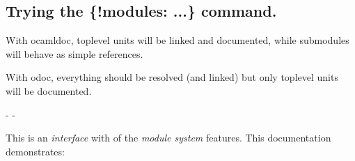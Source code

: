\\
    \hyperref[Ocamlary-IncludeInclude1]{}\label{Ocamlary-module-type-IncludeInclude2}\begin{ocamlindent}\label{Ocamlary-module-type-IncludeInclude2-type-include_include}\\
\end{ocamlindent}%
\\
\label{Ocamlary-module-IncludeInclude2_M}\begin{ocamlindent}\end{ocamlindent}%
\\
 \hyperref[Ocamlary-module-type-IncludeInclude2]{}\label{Ocamlary-type-include_include}\\
\subsection{Trying the \{!modules: ...\} command.\label{indexmodules}}%
With ocamldoc, toplevel units will be linked and documented, while submodules will behave as simple references.

With odoc, everything should be resolved (and linked) but only toplevel units will be documented.

\begin{description}\kern-\topsep
\makeatletter\advance\@topsepadd-\topsep\makeatother%
\item[{\hyperref[Ocamlary-Dep1-X]{\ocamlinlinecode{\ocamlinlinecode{Dep1.\allowbreak{}X}}[p\pageref*{Ocamlary-Dep1-X}]}}]{}%
\item[{\hyperref[Ocamlary-IncludeInclude1]{\ocamlinlinecode{\ocamlinlinecode{Ocamlary.\allowbreak{}IncludeInclude1}}[p\pageref*{Ocamlary-IncludeInclude1}]}}]{}%
\item[{\hyperref[Ocamlary]{\ocamlinlinecode{\ocamlinlinecode{Ocamlary}}[p\pageref*{Ocamlary}]}}]{This is an \emph{interface} with  of the \emph{module system} features. This documentation demonstrates:}\end{description}%
